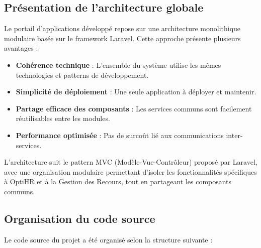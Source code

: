 
\subsection{Présentation de l'architecture globale}
Le portail d'applications développé repose sur une architecture monolithique modulaire basée sur le framework Laravel. Cette approche présente plusieurs avantages :

\begin{itemize}
    \item \textbf{Cohérence technique} : L'ensemble du système utilise les mêmes technologies et patterns de développement.
    \item \textbf{Simplicité de déploiement} : Une seule application à déployer et maintenir.
    \item \textbf{Partage efficace des composants} : Les services communs sont facilement réutilisables entre les modules.
    \item \textbf{Performance optimisée} : Pas de surcoût lié aux communications inter-services.
\end{itemize}

L'architecture suit le pattern MVC (Modèle-Vue-Contrôleur) proposé par Laravel, avec une organisation modulaire permettant d'isoler les fonctionnalités spécifiques à OptiHR et à la Gestion des Recours, tout en partageant les composants communs.

\subsection{Organisation du code source}
Le code source du projet a été organisé selon la structure suivante :







